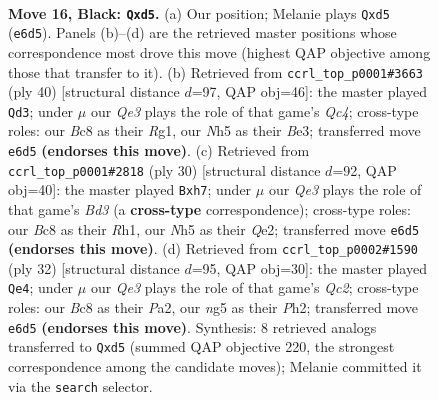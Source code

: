 \documentclass[11pt]{article}
\begin{document}
\begin{figure}[p]
\label{fig:thought-m29}
\end{figure}

\clearpage

\begin{figure}[p]\centering
\begin{subfigure}{0.46\textwidth}\centering
\resizebox{\linewidth}{!}{%
\newchessgame
\chessboard[
  setfen={r1b2rk1/pp4pp/n2bq3/P2Q1pNn/8/1P2P1P1/5PB1/RNB2RK1 b - - 2 16},
  showmover=false,
  pgfstyle=straightmove, color=movearrow, markmove={e6-d5}
]}
\caption{}
\end{subfigure}\hfill
\begin{subfigure}{0.46\textwidth}\centering
\resizebox{\linewidth}{!}{%
\newchessgame
\chessboard[
  setfen={r2b1rk1/1p3ppp/p1b5/3Np1P1/q1Q5/P3B3/1PP2P1P/2KR2R1 w - - 1 21},
  showmover=false,
  pgfstyle=straightmove, color=movearrow, markmove={c4-d3}
]}
\caption{}
\end{subfigure}
\\[4pt]
\begin{subfigure}{0.46\textwidth}\centering
\resizebox{\linewidth}{!}{%
\newchessgame
\chessboard[
  setfen={2kr1r2/1ppb1ppp/p3pn2/4N3/2Pq4/3B4/PP2QPPP/1K1R3R w - - 0 16},
  showmover=false,
  pgfstyle=straightmove, color=movearrow, markmove={d3-h7}
]}
\caption{}
\end{subfigure}\hfill
\begin{subfigure}{0.46\textwidth}\centering
\resizebox{\linewidth}{!}{%
\newchessgame
\chessboard[
  setfen={rn3r1k/p3bppB/bpp1p3/2q1N3/5B2/6P1/P1Q1PP1P/R4RK1 w - - 1 17},
  showmover=false,
  pgfstyle=straightmove, color=movearrow, markmove={c2-e4}
]}
\caption{}
\end{subfigure}
\caption{\textbf{Move 16, Black: \texttt{Qxd5}.} (a) Our position; Melanie plays \texttt{Qxd5} (\texttt{e6d5}). Panels (b)--(d) are the retrieved master positions whose correspondence most drove this move (highest QAP objective among those that transfer to it). (b) Retrieved from \texttt{ccrl\_top\_p0001\#3663} (ply 40) [structural distance $d$=97, QAP obj=46]: the master played \texttt{Qd3}; under $\mu$ our \emph{Qe3} plays the role of that game's \emph{Qc4}; cross-type roles: our \emph{B}c8 as their \emph{R}g1, our \emph{N}h5 as their \emph{B}e3; transferred move \texttt{e6d5} \textbf{(endorses this move)}. (c) Retrieved from \texttt{ccrl\_top\_p0001\#2818} (ply 30) [structural distance $d$=92, QAP obj=40]: the master played \texttt{Bxh7}; under $\mu$ our \emph{Qe3} plays the role of that game's \emph{Bd3} (a \textbf{cross-type} correspondence); cross-type roles: our \emph{B}c8 as their \emph{R}h1, our \emph{N}h5 as their \emph{Q}e2; transferred move \texttt{e6d5} \textbf{(endorses this move)}. (d) Retrieved from \texttt{ccrl\_top\_p0002\#1590} (ply 32) [structural distance $d$=95, QAP obj=30]: the master played \texttt{Qe4}; under $\mu$ our \emph{Qe3} plays the role of that game's \emph{Qc2}; cross-type roles: our \emph{B}c8 as their \emph{P}a2, our \emph{n}g5 as their \emph{P}h2; transferred move \texttt{e6d5} \textbf{(endorses this move)}. Synthesis: 8 retrieved analogs transferred to \texttt{Qxd5} (summed QAP objective 220, the strongest correspondence among the candidate moves); Melanie committed it via the \texttt{search} selector.}

\end{figure}
\end{document}
